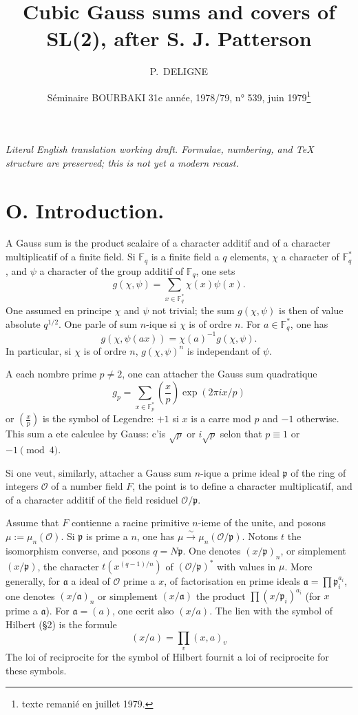 \documentclass[12pt,a4paper]{article}
\title{Cubic Gauss sums and covers of SL(2), after S. J. Patterson}
\author{P.~DELIGNE}
\date{Séminaire BOURBAKI 31e année, 1978/79, n° 539, juin 1979\footnote{texte remanié en juillet 1979.}}
\theoremstyle{plain}
\theoremstyle{definition}
\theoremstyle{remark}
\newcommand{\FF}{\mathbb{F}}
\newcommand{\cO}{\mathcal{O}}
\newcommand{\frakp}{\mathfrak{p}}
\newcommand{\fraka}{\mathfrak{a}}
\providecommand{\FF}{\mathbb{F}}
\providecommand{\cO}{\mathcal{O}}
\providecommand{\fraka}{\mathfrak{a}}
\providecommand{\frakp}{\mathfrak{p}}
\begin{document}
\begin{center}\small\emph{Literal English translation working draft. Formulae, numbering, and TeX structure are preserved; this is not yet a modern recast.}\end{center}
\vspace{0.5em}

\maketitle

\section*{O. Introduction.}

A Gauss sum is the product scalaire of a character additif and of a character multiplicatif of a finite field. Si $\FF_q$ is a finite field a $q$ elements, $\chi$ a character of $\FF_q^*$, and $\psi$ a character of the group additif of $\FF_q$, one sets
\[
g(\chi, \psi) = \sum_{x \in \FF_q^*} \chi(x) \psi(x).
\]
One assumed en principe $\chi$ and $\psi$ not trivial; the sum $g(\chi, \psi)$ is then of value absolute $q^{1/2}$. One parle of sum $n$-ique si $\chi$ is of ordre $n$. For $a \in \FF_q^*$, one has
\begin{equation}\label{eq:0.1}
g(\chi, \psi(ax)) = \chi(a)^{-1} g(\chi, \psi).
\tag{0.1}
\end{equation}
In particular, si $\chi$ is of ordre $n$, $g(\chi, \psi)^n$ is independant of $\psi$.

A each nombre prime $p \neq 2$, one can attacher the Gauss sum quadratique
\[
g_p = \sum_{x \in \FF_p^*} \left(\frac{x}{p}\right) \exp(2\pi i x/p)
\]
 or $\left(\frac{x}{p}\right)$ is the symbol of Legendre: $+1$ si $x$ is a carre mod $p$ and $-1$ otherwise. This sum a ete calculee by Gauss: c'is $\sqrt{p}$ or $i\sqrt{p}$ selon that $p \equiv 1$ or $-1 \pmod 4$.

Si one veut, similarly, attacher a Gauss sum $n$-ique a prime ideal $\frakp$ of the ring of integers $\cO$ of a number field $F$, the point is to define a character multiplicatif, and of a character additif of the field residuel $\cO/\frakp$.

Assume that $F$ contienne a racine primitive $n$-ieme of the unite, and posons $\mu := \mu_n(\cO)$. Si $\frakp$ is prime a $n$, one has $\mu \xrightarrow{\sim} \mu_n(\cO/\frakp)$. Notons $t$ the isomorphism converse, and posons $q = N\frakp$. One denotes $(x/\frakp)_n$, or simplement $(x/\frakp)$, the character $t(x^{(q-1)/n})$ of $(\cO/\frakp)^*$ with values in $\mu$. More generally, for $\fraka$ a ideal of $\cO$ prime a $x$, of factorisation en prime ideals $\fraka = \prod \frakp_i^{a_i}$, one denotes $(x/\fraka)_n$ or simplement $(x/\fraka)$ the product $\prod (x/\frakp_i)^{a_i}$ (for $x$ prime a $\fraka$). For $\fraka = (a)$, one ecrit also $(x/a)$. The lien with the symbol of Hilbert (\S 2) is the formule
\[
(x/a) = \prod_v (x, a)_v
\]
The loi of reciprocite for the symbol of Hilbert fournit a loi of reciprocite for these symbols.
\end{document}
